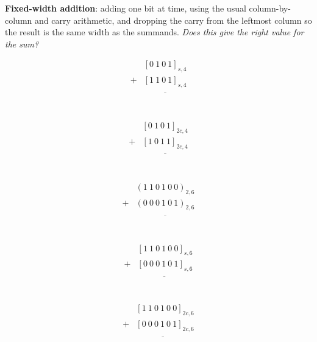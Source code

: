 
{\bf Fixed-width addition}: adding one bit at time, using the usual column-by-column and carry arithmetic, and dropping the carry from the leftmost column so the result is the same width as the summands.  {\it Does this give the right value for the sum?}
\begin{multicols}{2}
\begin{align*}
   & [0~ 1~ 0~ 1]_{s,4}\\
+ &  [1~ 1~ 0~ 1]_{s,4}\\
&\overline{\phantom{[0~0~1~0]_{s,4}}}\\
\end{align*}

\begin{align*}
   & [0~ 1~ 0~ 1]_{2c,4}\\
+ &  [1~ 0~ 1~ 1]_{2c,4}\\
&\overline{\phantom{[0~0~0~0]_{2c,4}}}\\
\end{align*}

\end{multicols}

\vfill

\begin{multicols}{3}
   \begin{align*}
      & (1~ 1~ 0~ 1~ 0~ 0)_{2,6}\\
   + & (0~ 0~ 0~ 1~ 0~ 1)_{2,6}\\
   &\overline{\phantom{(1~1~1~0~0~1)_{2,6}}}\\
   \end{align*}
   
   \begin{align*}
      & [1~ 1~ 0~ 1~ 0~ 0]_{s,6}\\
   + & [0~ 0~ 0~ 1~ 0~ 1]_{s,6}\\
   &\overline{\phantom{(1~1~1~0~0~1)_2}}\\
   \end{align*}
   
   \begin{align*}
      & [1~ 1~ 0~ 1~ 0~ 0]_{2c,6}\\
   + & [0~ 0~ 0~ 1~ 0~ 1]_{2c,6}\\
   &\overline{\phantom{(1~1~1~0~0~1)_2}}\\
   \end{align*}
\end{multicols}
\vfill

\newpage